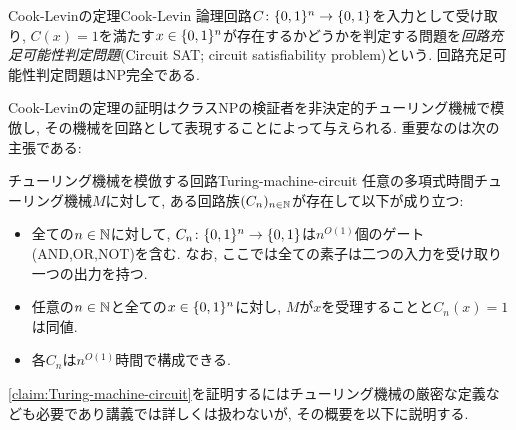\begin{theorem}{Cook-Levinの定理}{Cook-Levin}
  論理回路$C\colon\{0,1\}^n\to\{0,1\}$を入力として受け取り, $C(x)=1$を満たす$x\in\{0,1\}^n$が存在するかどうかを判定する問題を\emph{回路充足可能性判定問題}(Circuit SAT; circuit satisfiability problem)という.
  回路充足可能性判定問題はNP完全である.
\end{theorem}

Cook-Levinの定理の証明はクラスNPの検証者を非決定的チューリング機械で模倣し, その機械を回路として表現することによって与えられる. 重要なのは次の主張である:
\begin{claim}{チューリング機械を模倣する回路}{Turing-machine-circuit}
  任意の多項式時間チューリング機械$M$に対して, ある回路族$(C_n)_{n\in\mathbb{N}}$が存在して以下が成り立つ:
  \begin{itemize}
    \item 全ての$n\in\mathbb{N}$に対して, $C_n\colon\{0,1\}^n\to\{0,1\}$は$n^{O(1)}$個のゲート(AND,OR,NOT)を含む. なお, ここでは全ての素子は二つの入力を受け取り一つの出力を持つ.
    \item 任意の$n\in\mathbb{N}$と全ての$x\in\{0,1\}^n$に対し, $M$が$x$を受理することと$C_n(x)=1$は同値.
    \item 各$C_n$は$n^{O(1)}$時間で構成できる.
  \end{itemize}
\end{claim}
\cref{claim:Turing-machine-circuit}を証明するにはチューリング機械の厳密な定義なども必要であり講義では詳しくは扱わないが, その概要を以下に説明する.
